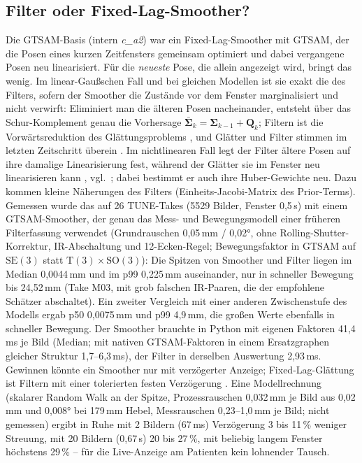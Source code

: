 \documentclass[11pt,a4paper,fleqn]{article}
\newcommand{\Sb}{\bar{\boldsymbol{\Sigma}}_k}
\begin{document}
\subsection{Filter oder Fixed-Lag-Smoother?}
\label{sec:smoother}

Die GTSAM-Basis (intern \emph{c\_a2}) war ein Fixed-Lag-Smoother mit GTSAM, der die Posen eines kurzen
Zeitfensters gemeinsam optimiert und dabei vergangene Posen neu linearisiert. Für die \emph{neueste} Pose, die
allein angezeigt wird, bringt das wenig. Im linear-Gaußschen Fall und bei gleichen Modellen ist sie exakt die des
Filters, sofern der Smoother die Zustände vor dem Fenster marginalisiert und nicht verwirft: Eliminiert man die
älteren Posen nacheinander, entsteht über das Schur-Komplement genau die Vorhersage
$\Sb = \boldsymbol{\Sigma}_{k-1} + \mathbf{Q}_k$; Filtern ist die Vorwärtsreduktion des Glättungsproblems
\cite[§8.2]{triggs2000bundle}, und Glätter und Filter stimmen im letzten Zeitschritt überein
\cite[Thm.~8.2]{saerkkae2013bayesian}. Im nichtlinearen Fall legt der Filter ältere Posen auf ihre damalige
Linearisierung fest, während der Glätter sie im Fenster neu linearisieren kann
\cite[§8.2, S.~334--335]{triggs2000bundle}, vgl.\ \cite[Abschn.~VII]{kaess2012concurrent}; dabei bestimmt er
auch ihre Huber-Gewichte neu. Dazu kommen kleine Näherungen des Filters (Einheits-Jacobi-Matrix des Prior-Terms). Gemessen wurde das auf 26 TUNE-Takes
(5529 Bilder, Fenster 0,5\,s) mit einem GTSAM-Smoother, der genau das Mess- und Bewegungsmodell einer früheren
Filterfassung verwendet (Grundrauschen 0,05\,mm / 0,02°, ohne Rolling-Shutter-Korrektur, IR-Abschaltung und
12-Ecken-Regel; Bewegungsfaktor in GTSAM auf $\mathrm{SE}(3)$ statt $\mathrm{T}(3)\times\mathrm{SO}(3)$): Die
Spitzen von Smoother und Filter liegen im Median 0,0044\,mm und im p99 0,225\,mm auseinander, nur in schneller
Bewegung bis 24,52\,mm (Take M03, mit grob falschen IR-Paaren, die der empfohlene Schätzer abschaltet). Ein
zweiter Vergleich mit einer anderen Zwischenstufe des Modells ergab p50 0,0075\,mm und p99 4,9\,mm, die großen
Werte ebenfalls in schneller Bewegung. Der Smoother brauchte in Python mit eigenen Faktoren 41,4\,ms je Bild
(Median; mit nativen GTSAM-Faktoren in einem Ersatzgraphen gleicher Struktur 1,7--6,3\,ms), der Filter in
derselben Auswertung 2,93\,ms. Gewinnen könnte ein Smoother nur mit verzögerter Anzeige; Fixed-Lag-Glättung ist
Filtern mit einer tolerierten festen Verzögerung \cite[S.~160]{saerkkae2013bayesian}. Eine Modellrechnung
(skalarer Random Walk an der Spitze, Prozessrauschen 0,032\,mm je Bild aus 0,02\,mm und 0,008° bei 179\,mm
Hebel, Messrauschen 0,23--1,0\,mm je Bild; nicht gemessen) ergibt in Ruhe mit 2 Bildern (67\,ms) Verzögerung 3
bis 11\,\% weniger Streuung, mit 20 Bildern (0,67\,s) 20 bis 27\,\%, mit beliebig langem Fenster höchstens
29\,\% -- für die Live-Anzeige am Patienten kein lohnender Tausch.
\end{document}
